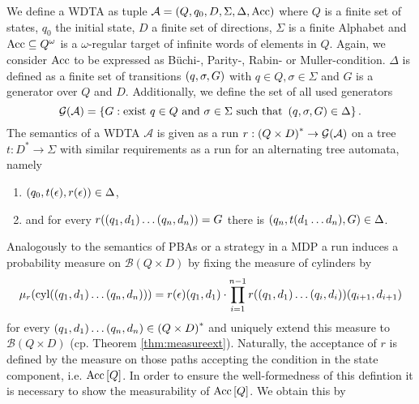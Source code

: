 \begin{definition}
  We define a \acl{WDTA} as tuple
  $\mathcal{A} = \left(Q, q_{0}, D, \Sigma, \Delta, \operatorname{Acc}\right)$ where $Q$ is a 
  finite set of states, $q_{0}$ the initial state, $D$ a finite set of 
  directions, $\Sigma$ is a finite Alphabet and $\operatorname{Acc}\subseteq Q^{\omega}$ is a
  $\omega$-regular target of infinite words of elements in $Q$. Again, we 
  consider $\operatorname{Acc}$ to be expressed as Büchi-, Parity-, Rabin- or 
  Muller-condition. $\Delta$ is defined as a finite set of transitions 
  $\left(q,\sigma,G\right)$ with $q\in Q, \sigma\in\Sigma$ and $G$ is a generator 
  over $Q$ and $D$. Additionally, we define the set of all used generators 
  \begin{equation*}
    \mathcal{G}(\mathcal{A}) = \left\{
      G:\text{exist }q\in Q\text{ and }\sigma\in\Sigma
      \text{ such that }\left(q,\sigma,G\right)\in\Delta
    \right\}.
  \end{equation*}
  The semantics of a \ac{WDTA} $\mathcal{A}$ is given as a run
  $r:\left(Q\times D\right)^{*}\rightarrow \mathcal{G}(\mathcal{A})$ on a tree 
  $t:D^{*}\rightarrow\Sigma$ with similar requirements as a run for an 
  alternating tree automata, namely
  \begin{enumerate}
    \item $\left(q_{0}, t(\epsilon), r(\epsilon)\right)\in\Delta$,
    \item and for every $r(\left(q_{1}, d_{1}\right)\dots\left(q_{n}, d_{n}\right)) = G$ 
      there is $\left(q_{n}, t(d_{1}\dots d_{n}), G\right)\in\Delta$.
  \end{enumerate}
\end{definition}
Analogously to the semantics of \acp{PBA} or a strategy in a \ac{MDP} a run 
induces a probability measure on $\mathcal{B}(Q\times D)$ by fixing the measure
of cylinders by 
\begin{equation*}
  \mu_{r}(\operatorname{cyl}(\left(q_{1},d_{1}\right)\dots\left(q_{n},d_{n}\right)))
    = r(\epsilon)(q_{1},d_{1})\cdot\prod\limits_{i = 1}^{n - 1}
    r(\left(q_{1},d_{1}\right)\dots\left(q_{i},d_{i}\right))(q_{i+1},d_{i+1})
\end{equation*}
for every $\left(q_{1},d_{1}\right)\dots\left(q_{n},d_{n}\right)\in\left(Q\times D\right)^{*}$
and uniquely extend this measure to $\mathcal{B}(Q\times D)$ (cp. Theorem 
\ref{thm:measureext}). Naturally, the acceptance of $r$ is defined by the 
measure on those paths accepting the condition in the state component, i.e. 
$\operatorname{Acc}\left[Q\right]$. In order to ensure the well-formedness of this defintion it 
is necessary to show the measurability of $\operatorname{Acc}\left[Q\right]$. We obtain this by
